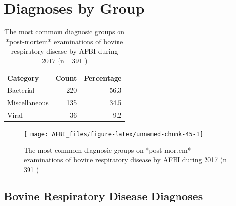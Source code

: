 \documentclass[]{book}
\begin{document}
\section{Diagnoses by Group}\label{diagnoses-by-group-1}

\begin{table}

\caption{\label{tab:unnamed-chunk-44}The most commom diagnosic groups on *post-mortem* examinations of bovine respiratory disease by AFBI during 2017 (n= 391 )}
\centering
\begin{tabular}[t]{l|r|r}
\hline
Category & Count & Percentage\\
\hline
Bacterial & 220 & 56.3\\
\hline
Miscellaneous & 135 & 34.5\\
\hline
Viral & 36 & 9.2\\
\hline
\end{tabular}
\end{table}

\begin{figure}

{\centering \texttt{[image: AFBI\_files/figure-latex/unnamed-chunk-45-1]} 

}

\caption{The most commom diagnosic groups on *post-mortem* examinations of bovine respiratory disease by AFBI during 2017 (n= 391 )}\label{fig:unnamed-chunk-45}
\end{figure}

\subsection{Bovine Respiratory Disease
Diagnoses}\label{bovine-respiratory-disease-diagnoses}
\end{document}
